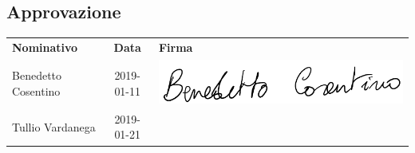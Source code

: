 \subsection{Approvazione}
{\renewcommand{\arraystretch}{1.4}%
\begin{table}[H]
	\centering
	\begin{tabular}{| l | c | >{\centering\arraybackslash}m{8cm}
			|} 
	\rowcolor{LightBlue}
	\textbf{\color{white}Nominativo} & 
	\textbf{\color{white}Data} & 
	\textbf{\color{white}Firma} \\
	
	Benedetto Cosentino & 2019-01-11 & \includegraphics[scale=0.5]{images/firme/benedetto.pdf}\\[1cm]
	Tullio Vardanega & 2019-01-21 & \\[0.5cm] \hline
\end{tabular}
\end{table}
}
\newpage
